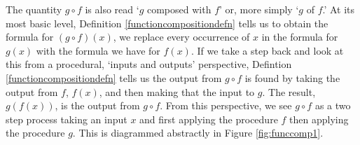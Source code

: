 \smallskip



\smallskip

The quantity $g \circ f$ is also read `$g$ composed with $f$' or, more simply `$g$ of $f$.' At its most basic level, Definition \ref{functioncompositiondefn} tells us to obtain the formula for $\left(g \circ f\right)(x)$, we replace every occurrence of $x$ in the formula for $g(x)$ with the formula we have for $f(x)$.  If we take a step back and look at this from a procedural, `inputs and outputs' perspective, Defintion \ref{functioncompositiondefn} tells us  the output from $g \circ f$ is found by taking the output from $f$, $f(x)$,  and then making that the input to $g$.  The result, $g(f(x))$, is the output from $g \circ f$.  From this perspective, we see $g \circ f$ as a two step process taking an input $x$ and first applying the procedure $f$ then applying the procedure $g$.  This is diagrammed abstractly in Figure \ref{fig:funccomp1}.



\medskip



